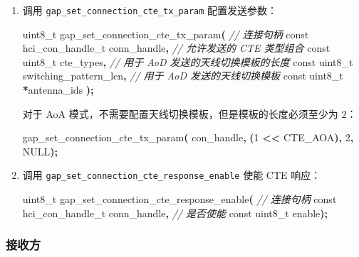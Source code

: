 \documentclass[
  12pt,
]{book}
\newenvironment{Shaded}{\begin{snugshade}}{\end{snugshade}}
\newcommand{\CommentTok}[1]{\textcolor[rgb]{0.56,0.35,0.01}{\textit{#1}}}
\newcommand{\DataTypeTok}[1]{\textcolor[rgb]{0.13,0.29,0.53}{#1}}
\newcommand{\DecValTok}[1]{\textcolor[rgb]{0.00,0.00,0.81}{#1}}
\newcommand{\NormalTok}[1]{#1}
\newcommand{\OperatorTok}[1]{\textcolor[rgb]{0.81,0.36,0.00}{\textbf{#1}}}
\begin{document}
\begin{enumerate}
\def\labelenumi{\arabic{enumi}.}
\item
  调用 \texttt{gap\_set\_connection\_cte\_tx\_param} 配置发送参数：

\begin{Shaded}
\begin{Highlighting}[]
\DataTypeTok{uint8\_t}\NormalTok{ gap\_set\_connection\_cte\_tx\_param}\OperatorTok{(}
  \CommentTok{// 连接句柄}
  \DataTypeTok{const}\NormalTok{ hci\_con\_handle\_t  conn\_handle}\OperatorTok{,}
  \CommentTok{// 允许发送的 CTE 类型组合}
  \DataTypeTok{const} \DataTypeTok{uint8\_t}\NormalTok{           cte\_types}\OperatorTok{,}
  \CommentTok{// 用于 AoD 发送的天线切换模板的长度}
  \DataTypeTok{const} \DataTypeTok{uint8\_t}\NormalTok{           switching\_pattern\_len}\OperatorTok{,}
  \CommentTok{// 用于 AoD 发送的天线切换模板}
  \DataTypeTok{const} \DataTypeTok{uint8\_t}          \OperatorTok{*}\NormalTok{antenna\_ids}
\OperatorTok{);}
\end{Highlighting}
\end{Shaded}

  对于 AoA 模式，不需要配置天线切换模板，但是模板的长度必须至少为 \(2\)：

\begin{Shaded}
\begin{Highlighting}[]
\NormalTok{gap\_set\_connection\_cte\_tx\_param}\OperatorTok{(}
\NormalTok{  con\_handle}\OperatorTok{,} \OperatorTok{(}\DecValTok{1} \OperatorTok{\textless{}\textless{}}\NormalTok{ CTE\_AOA}\OperatorTok{),} \DecValTok{2}\OperatorTok{,}\NormalTok{ NULL}\OperatorTok{);}
\end{Highlighting}
\end{Shaded}
\item
  调用 \texttt{gap\_set\_connection\_cte\_response\_enable} 使能 CTE 响应：

\begin{Shaded}
\begin{Highlighting}[]
\DataTypeTok{uint8\_t}\NormalTok{ gap\_set\_connection\_cte\_response\_enable}\OperatorTok{(}
  \CommentTok{// 连接句柄}
  \DataTypeTok{const}\NormalTok{ hci\_con\_handle\_t  conn\_handle}\OperatorTok{,}
  \CommentTok{// 是否使能}
  \DataTypeTok{const} \DataTypeTok{uint8\_t}\NormalTok{           enable}\OperatorTok{);}
\end{Highlighting}
\end{Shaded}
\end{enumerate}

\hypertarget{ux63a5ux6536ux65b9}{%
\subsubsection{接收方}\label{ux63a5ux6536ux65b9}}
\end{document}
